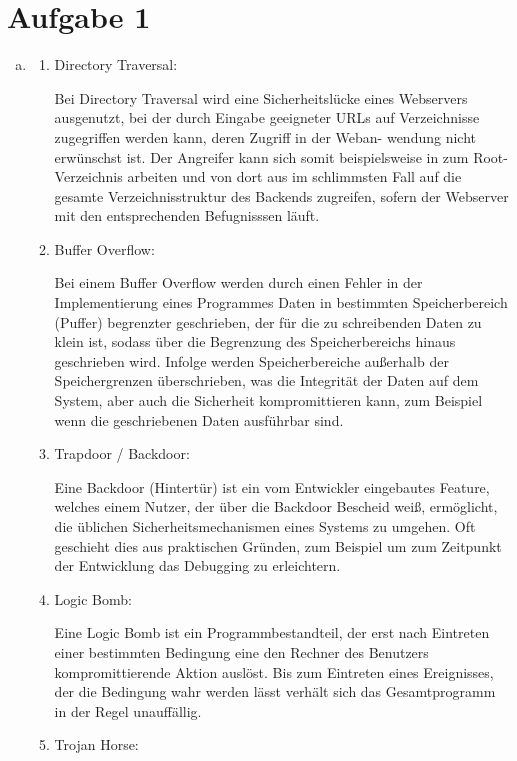 \documentclass[numbers=noendperiod]{scrartcl}
\begin{document}
\section*{Aufgabe 1}
\begin{enumerate}[a)]
	\item 
	\begin{enumerate}
		\item Directory Traversal:
		
		Bei Directory Traversal wird eine Sicherheitslücke eines Webservers ausgenutzt, bei der durch
		Eingabe geeigneter URLs auf Verzeichnisse zugegriffen werden kann, deren Zugriff in der Weban-
		wendung nicht erwünschst ist. Der Angreifer kann sich somit beispielsweise in zum Root-Verzeichnis
		arbeiten und von dort aus im schlimmsten Fall auf die gesamte Verzeichnisstruktur des Backends zugreifen, sofern der
		Webserver mit den entsprechenden Befugnisssen läuft.
		
		\item Buffer Overflow:
		
		Bei einem Buffer Overflow werden durch einen Fehler in der Implementierung eines Programmes Daten in
		bestimmten Speicherbereich (Puffer) begrenzter geschrieben, der für die zu schreibenden Daten zu klein
		ist, sodass über die Begrenzung des Speicherbereichs hinaus geschrieben wird. Infolge werden Speicherbereiche
		außerhalb der Speichergrenzen überschrieben, was die Integrität der Daten auf dem System, aber auch die
		Sicherheit kompromittieren kann, zum Beispiel wenn die geschriebenen Daten ausführbar sind.
		
		\item Trapdoor / Backdoor:
		
		Eine Backdoor (Hintertür) ist ein vom Entwickler eingebautes Feature, welches einem Nutzer, der über
		die Backdoor Bescheid weiß, ermöglicht, die üblichen Sicherheitsmechanismen eines Systems zu umgehen.
		Oft geschieht dies aus praktischen Gründen, zum Beispiel um zum Zeitpunkt der Entwicklung das Debugging
		zu erleichtern.
		
		\item Logic Bomb:
		
		Eine Logic Bomb ist ein Programmbestandteil, der erst nach Eintreten einer bestimmten Bedingung eine den
		Rechner des Benutzers kompromittierende Aktion auslöst. Bis zum Eintreten eines Ereignisses, der die
		Bedingung wahr werden lässt verhält sich das Gesamtprogramm in der Regel unauffällig.
		
		\item Trojan Horse:
		

\end{enumerate}
\end{enumerate}
\end{document}
